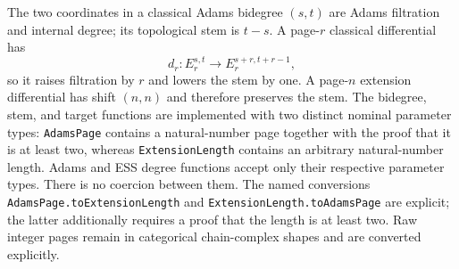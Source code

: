 \begin{definition}
  \label{def:adams-bidegree}
  \leanok
  The two coordinates in a classical Adams bidegree $(s,t)$ are Adams
  filtration and internal degree; its topological stem is $t-s$.  A
  page-$r$ classical differential has
  \[
    d_r:E_r^{s,t}\longrightarrow E_r^{s+r,t+r-1},
  \]
  so it raises filtration by $r$ and lowers the stem by one.  A page-$n$
  extension differential has shift $(n,n)$ and therefore preserves the stem.
  The bidegree, stem, and target functions are implemented with two distinct
  nominal parameter types: \texttt{AdamsPage} contains a natural-number page
  together with the proof that it is at least two, whereas
  \texttt{ExtensionLength} contains an arbitrary natural-number length.
  Adams and ESS degree functions accept only their respective parameter
  types.  There is no coercion between them.  The named conversions
  \texttt{AdamsPage.toExtensionLength} and
  \texttt{ExtensionLength.toAdamsPage} are explicit; the latter additionally
  requires a proof that the length is at least two.  Raw integer pages remain
  in categorical chain-complex shapes and are converted explicitly.
\end{definition}

